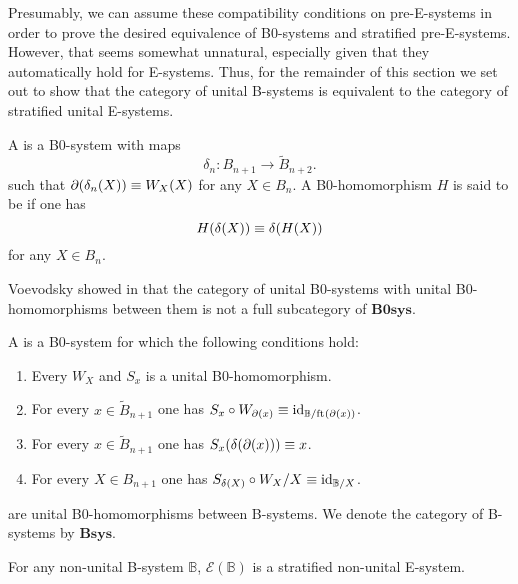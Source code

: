 Presumably, we can assume these compatibility conditions on pre-E-systems in order
to prove the desired equivalence of B0-systems and stratified pre-E-systems. However,
that seems somewhat unnatural, especially given that they automatically hold
for E-systems. Thus, for the remainder of this section we set out to show that
the category of unital B-systems is equivalent to the category of stratified 
unital E-systems.

\begin{defn}
A  is a B0-system with maps
\begin{equation*}
\delta_n : B_{n+1}\to \tilde{B}_{n+2}.
\end{equation*}
such that $\partial_{}(\delta_n(X))\equiv W_{X}(X)$ for any $X\in B_n$. 
A B0-homomorphism $H$ is said to be  if one has
\begin{equation*}
H(\delta(X))\equiv\delta(H(X))
\end{equation*}
for any $X\in B_n$.  
\end{defn}

\begin{rmk}
Voevodsky showed in \cite{VV_B-systems} that the category of unital B0-systems
with unital B0-homomorphisms between them is not a full
subcategory of $\mathbf{B0sys}$. 
\end{rmk}

\begin{defn}
A  is a B0-system for which the following conditions
hold:
\begin{enumerate}
\item Every $W_X$ and $S_x$ is a unital B0-homomorphism.
\item For every $x\in \tilde{B}_{n+1}$ one has $S_x\circ W_{\partial_{}(x)}\equiv
{\mathrm{id}_{\mathbb{B}/\mathrm{ft}_{}(\partial_{}(x))}}$. 
\item For every $x\in\tilde{B}_{n+1}$ one has $S_x(\delta(\partial_{}(x)))\equiv x$.
\item For every $X\in B_{n+1}$ one has $S_{\delta(X)}\circ W_X/X\equiv
{\mathrm{id}_{\mathbb{B}/X}}$. 
\end{enumerate}
 are unital B0-homomorphisms between B-systems.
We denote the category of B-systems by $\mathbf{Bsys}$. 
\end{defn}

\begin{lem}
For any non-unital B-system $\mathbb{B}$, $\mathcal{E}(\mathbb{B})$ is a 
stratified non-unital E-system. 
\end{lem}

